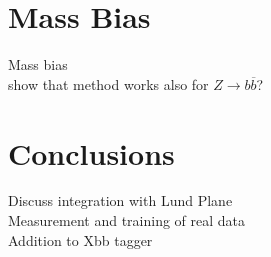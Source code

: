 \documentclass[10pt,a4paper]{book}
\begin{document}
\section{Mass Bias}
Mass bias \\
show that method works also for $Z\rightarrow b\overline{b}$?

\section{Conclusions}
Discuss integration with Lund Plane \\
Measurement and training of real data \\
Addition to Xbb tagger

\end{document}

